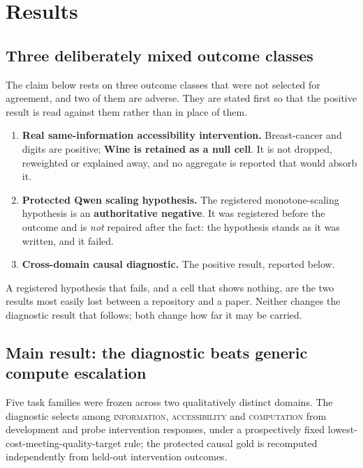 \section{Results}



\subsection{Three deliberately mixed outcome classes}

The claim below rests on three outcome classes that were not selected for
agreement, and two of them are adverse. They are stated first so that the
positive result is read against them rather than in place of them.

\begin{enumerate}
\item \textbf{Real same-information accessibility intervention.} Breast-cancer
and digits are positive; \textbf{Wine is retained as a null cell}. It is not
dropped, reweighted or explained away, and no aggregate is reported that would
absorb it.
\item \textbf{Protected Qwen scaling hypothesis.} The registered
monotone-scaling hypothesis is an \textbf{authoritative negative}. It was
registered before the outcome and is \emph{not} repaired after the fact: the
hypothesis stands as it was written, and it failed.
\item \textbf{Cross-domain causal diagnostic.} The positive result, reported
below.
\end{enumerate}

A registered hypothesis that fails, and a cell that shows nothing, are the two
results most easily lost between a repository and a paper. Neither changes the
diagnostic result that follows; both change how far it may be carried.

\subsection{Main result: the diagnostic beats generic compute escalation}

Five task families were frozen across two qualitatively distinct domains. The
diagnostic selects among \textsc{information}, \textsc{accessibility} and
\textsc{computation} from development and probe intervention responses, under a
prospectively fixed lowest-cost-meeting-quality-target rule; the protected causal
gold is recomputed independently from held-out intervention outcomes.

